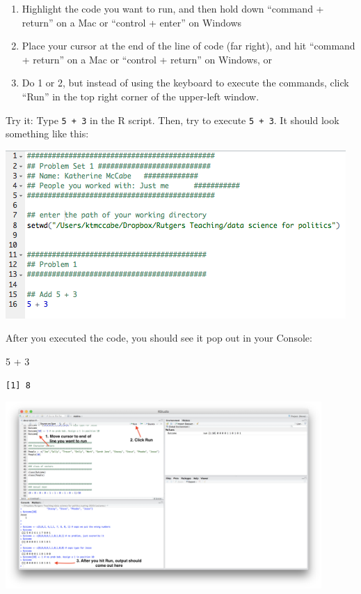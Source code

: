 \documentclass[
  letterpaper,
  DIV=11,
  numbers=noendperiod]{scrreprt}
\newenvironment{Shaded}{\begin{snugshade}}{\end{snugshade}}
\newcommand{\DecValTok}[1]{\textcolor[rgb]{0.68,0.00,0.00}{#1}}
\newcommand{\SpecialCharTok}[1]{\textcolor[rgb]{0.37,0.37,0.37}{#1}}
\providecommand{\tightlist}{%
  \setlength{\itemsep}{0pt}\setlength{\parskip}{0pt}}\usepackage{longtable,booktabs,array}
\begin{document}
\begin{enumerate}
\def\labelenumi{\arabic{enumi}.}
\tightlist
\item
  Highlight the code you want to run, and then hold down ``command +
  return'' on a Mac or ``control + enter'' on Windows
\item
  Place your cursor at the end of the line of code (far right), and hit
  ``command + return'' on a Mac or ``control + return'' on Windows, or
\item
  Do 1 or 2, but instead of using the keyboard to execute the commands,
  click ``Run'' in the top right corner of the upper-left window.
\end{enumerate}

Try it: Type \texttt{5\ +\ 3} in the R script. Then, try to execute
\texttt{5\ +\ 3}. It should look something like this:

\includegraphics{images/rtemplate2.png}

After you executed the code, you should see it pop out in your Console:

\begin{Shaded}
\begin{Highlighting}[]
\DecValTok{5} \SpecialCharTok{+} \DecValTok{3}
\end{Highlighting}
\end{Shaded}

\begin{verbatim}
[1] 8
\end{verbatim}

\includegraphics[width=0.9\textwidth,height=\textheight]{images/runningcode.png}
\end{document}
